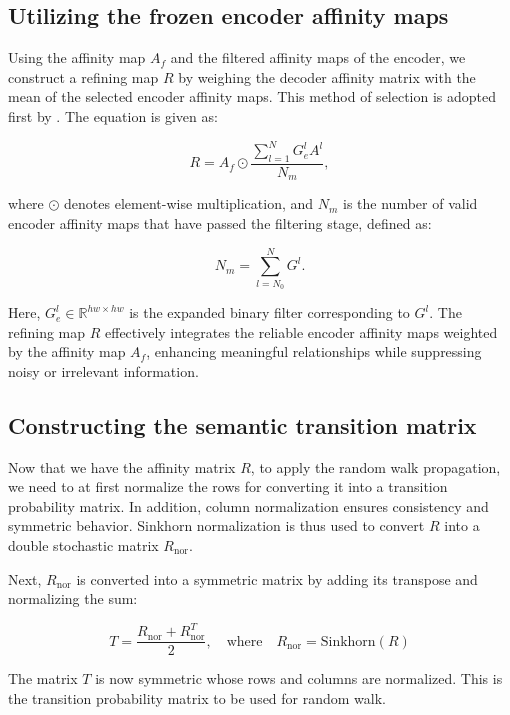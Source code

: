 \subsection{Utilizing the frozen encoder affinity maps}
\label{subsec: mul_attn_and_aff}
Using the affinity map $A_f$ and the filtered affinity maps of the encoder, we construct a refining map $R$ by weighing the decoder affinity matrix with the mean of the selected encoder affinity maps. This method of selection is adopted first by \cite{wsss_frozen_clip}. The equation is given as:

\begin{equation}
    R = A_f \odot \frac{ \sum_{l=1}^N G^l_e A^l}{N_m},
\end{equation}

where $\odot$ denotes element-wise multiplication, and $N_m$ is the number of valid encoder affinity maps that have passed the filtering stage, defined as:

\begin{equation}
    N_m = \sum_{l = N_0}^N G^l.
\end{equation}

Here, $G^l_e \in \mathbb{R}^{hw \times hw}$ is the expanded binary filter corresponding to $G^l$. The refining map $R$ effectively integrates the reliable encoder affinity maps weighted by the affinity map $A_f$, enhancing meaningful relationships while suppressing noisy or irrelevant information.

\subsection{Constructing the semantic transition matrix}
\label{subsec:trans_mat}
Now that we have the affinity matrix $R$, to apply the random walk propagation, we need to at first normalize the rows for converting it into a transition probability matrix. In addition, column normalization ensures consistency and symmetric behavior. Sinkhorn normalization \cite{math_sinkhorn} is thus used to convert $R$ into a double stochastic matrix $R_{\text{nor}}$.

Next, $R_{\text{nor}}$ is converted into a symmetric matrix by adding its transpose and normalizing the sum:

\[
    T = \frac{R_{\text{nor}} + R_{\text{nor}}^T}{2}, \quad \text{where} \quad R_{\text{nor}} = \text{Sinkhorn}(R)
\]

The matrix $T$ is now symmetric whose rows and columns are normalized. This is the transition probability matrix to be used for random walk.


